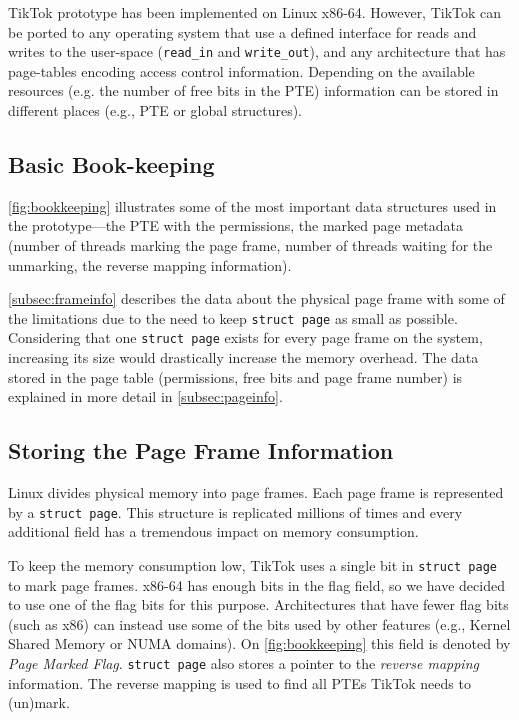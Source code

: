 \documentclass[conference]{IEEEtran}
\newcommand{\sysname}{TikTok}
\begin{document}
\sysname{} prototype has been implemented on Linux x86-64. However, \sysname{}
can be ported to any operating system that use a defined interface for reads and
writes to the user-space (\texttt{read\_in} and \texttt{write\_out}), and any
architecture that has page-tables encoding access control information. Depending
on the available resources (e.g. the number of free bits in the PTE) information
can be stored in different places (e.g., PTE or global structures).

\subsection{Basic Book-keeping}
\autoref{fig:bookkeeping} illustrates some of the most important data structures
used in the prototype---the PTE with the permissions, the marked page metadata
(number of threads marking the page frame, number of threads waiting for the
unmarking, the reverse mapping information). 

\autoref{subsec:frameinfo} describes the data about the physical page frame with
some of the limitations due to the need to keep \texttt{struct page} as small as
possible. Considering that one \texttt{struct page} exists for every page frame
on the system, increasing its size would drastically increase the memory
overhead.  The data stored in the page table (permissions, free bits and page
frame number) is explained in more detail in \autoref{subsec:pageinfo}.

\subsection{Storing the Page Frame Information}
\label{subsec:frameinfo}
Linux divides physical memory into page frames. Each page frame is represented
by a \texttt{struct page}. This structure is replicated millions of times and
every additional field has a tremendous impact on memory consumption.

To keep the memory consumption low, \sysname{} uses a single bit in \texttt{struct
page} to mark page frames. x86-64 has enough bits in the flag
field, so we have decided to use one of the flag bits for this purpose.
Architectures that have fewer flag bits (such as x86) can instead use some of
the bits used by other features (e.g., Kernel Shared Memory or NUMA domains). On
\autoref{fig:bookkeeping} this field is denoted by \emph{Page Marked Flag}.
\texttt{struct page} also stores a pointer to the \emph{reverse mapping}
information. The reverse mapping is used to find all PTEs \sysname{} needs to
(un)mark.
\end{document}
